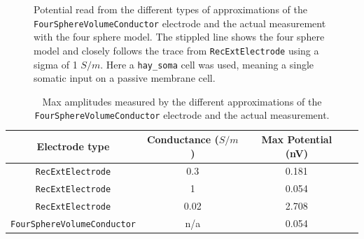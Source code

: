\documentclass[final, a4paper,masters,en,listoffigures,listoftables,norwegiandates]{NMBU}
\begin{document}
\begin{figure}[h]
    \centering
    \caption{Potential read from the different types of approximations of the \newline\texttt{FourSphereVolumeConductor} electrode and the actual measurement with the four sphere model. The stippled line shows the four sphere model and closely follows the trace from \texttt{RecExtElectrode} using a sigma of 1 $S/m$. Here a \texttt{hay\_soma} cell was used, meaning a single somatic input on a passive membrane cell.}
    \label{fig:FourSphereComp}
\end{figure}

\begin{table}[h]
    \centering
        \begin{tabular}{|c|c|c|c|}
        \hline
        Electrode type & Conductance ($S/m$) & Max Potential (nV) \\
        \hline
        \texttt{RecExtElectrode} & 0.3 & 0.181 \\
        \hline
        \texttt{RecExtElectrode} & 1 & 0.054 \\
        \hline
        \texttt{RecExtElectrode} & 0.02 & 2.708 \\
        \hline
        \texttt{FourSphereVolumeConductor} & n/a & 0.054 \\
        \hline
    \end{tabular}
    \caption{Max amplitudes measured by the different approximations of the \newline\texttt{FourSphereVolumeConductor} electrode and the actual measurement.}
    \label{tab:FourSphereAmps}
\end{table}

\newpage
\end{document}
